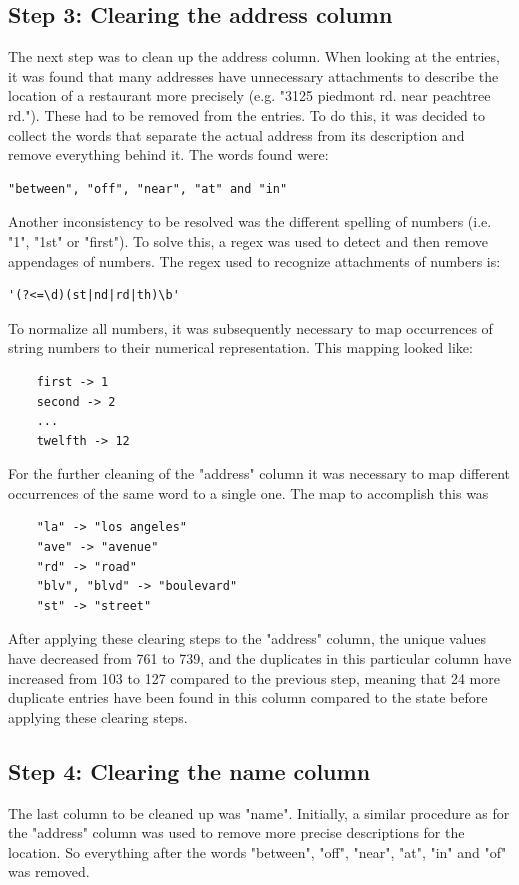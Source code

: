 \documentclass[conference]{IEEEtran}
\begin{document}
\subsection{Step 3: Clearing the address column}
The next step was to clean up the address column. When looking at the entries, it was found that many addresses have unnecessary attachments to describe the location of a restaurant more precisely (e.g. "3125 piedmont rd. near peachtree rd."). These had to be removed from the entries. To do this, it was decided to collect the words that separate the actual address from its description and remove everything behind it. The words found were: 
\begin{lstlisting}
"between", "off", "near", "at" and "in"
\end{lstlisting}
Another inconsistency to be resolved was the different spelling of numbers (i.e. "1", "1st" or "first"). To solve this, a regex was used to detect and then remove appendages of numbers. The regex used to recognize attachments of numbers is: 
\begin{lstlisting}
'(?<=\d)(st|nd|rd|th)\b'
\end{lstlisting}
To normalize all numbers, it was subsequently necessary to map occurrences of string numbers to their numerical representation. This mapping looked like: 
\begin{lstlisting}
	first -> 1
	second -> 2
	...
	twelfth -> 12
\end{lstlisting} 
For the further cleaning of the "address" column it was necessary to map different occurrences of the same word to a single one. The map to accomplish this was 
\begin{lstlisting}
	"la" -> "los angeles" 
	"ave" -> "avenue"
	"rd" -> "road"
	"blv", "blvd" -> "boulevard" 
	"st" -> "street"
\end{lstlisting} 
After applying these clearing steps to the "address" column, the unique values have decreased from 761 to 739, and the duplicates in this particular column have increased from 103 to 127 compared to the previous step, meaning that 24 more duplicate entries have been found in this column compared to the state before applying these clearing steps.
\subsection{Step 4: Clearing the name column}
The last column to be cleaned up was "name". Initially, a similar procedure as for the "address" column was used to remove more precise descriptions for the location. So everything after the words "between", "off", "near", "at", "in" and "of" was removed.
\end{document}
